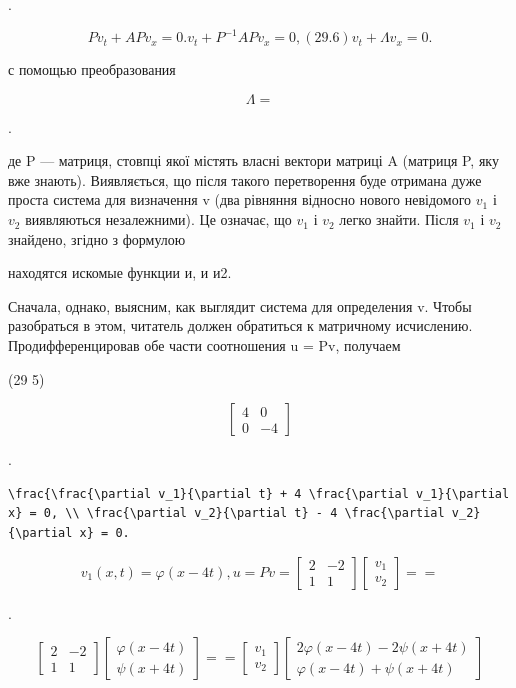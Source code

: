 \documentclass[
  ukrainian,
]{article}
\begin{document}
.

\[
Pv_t + APv_x = 0.
v_t + P^{-1}APv_x = 0,
(29.6) v_t + \Lambda v_x = 0.
\]

с помощью преобразования

\[
\Lambda =
\]

.

де P --- матриця, стовпці якої містять власні вектори матриці A (матриця
P, яку вже знають). Виявляється, що після такого перетворення буде
отримана дуже проста система для визначення v (два рівняння відносно
нового невідомого \(v_1\) і \(v_2\) виявляються незалежними). Це
означає, що \(v_1\) і \(v_2\) легко знайти. Після \(v_1\) і \(v_2\)
знайдено, згідно з формулою

находятся искомые функции и, и и2.

Сначала, однако, выясним, как выглядит система для определения v. Чтобы
разобраться в этом, читатель должен обратиться к матричному исчислению.
Продифференцировав обе части соотношения u = Pv, получаем

(29 5)

\[
\begin{bmatrix} 4 & 0 \\ 0 & -4 \end{bmatrix}
\]

.

\begin{verbatim}
\frac{\frac{\partial v_1}{\partial t} + 4 \frac{\partial v_1}{\partial x} = 0, \\ \frac{\partial v_2}{\partial t} - 4 \frac{\partial v_2}{\partial x} = 0.
\end{verbatim}

\[
v_1(x, t) = \varphi(x-4t),
u = Pv =
\begin{bmatrix} 2 & -2 \\ 1 & 1 \end{bmatrix}
\begin{bmatrix} v_1 \\ v_2 \end{bmatrix}
=
=
\]

.

\[
\begin{bmatrix} 2 & -2 \\ 1 & 1 \end{bmatrix}
\begin{bmatrix} \varphi(x - 4t) \\ \psi(x + 4t) \end{bmatrix}
=
=
\begin{bmatrix} v_1 \\ v_2 \end{bmatrix}
\begin{bmatrix} 2\varphi(x - 4t) - 2\psi(x + 4t) \\ \varphi(x - 4t) + \psi(x + 4t) \end{bmatrix}
\]
\end{document}
